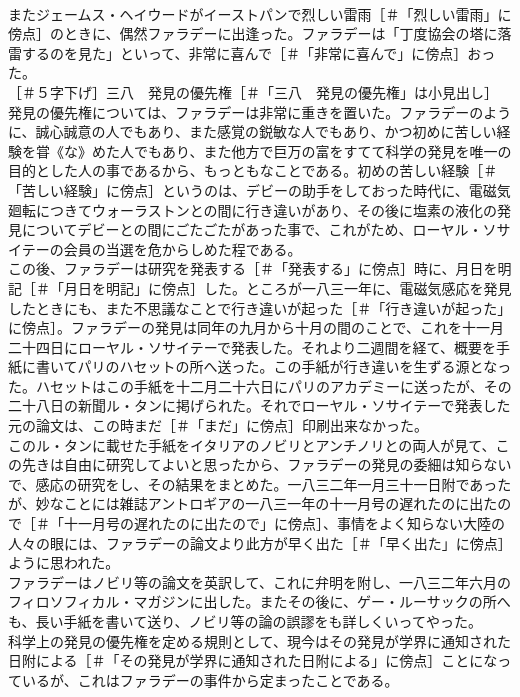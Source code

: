 \documentclass[8pt]{extreport}
\begin{document}
\begin{CJK}{UTF8}{min}
\\	またジェームス・ヘイウードがイーストパンで烈しい雷雨［＃「烈しい雷雨」に傍点］のときに、偶然ファラデーに出逢った。ファラデーは「丁度協会の塔に落雷するのを見た」といって、非常に喜んで［＃「非常に喜んで」に傍点］おった。
\\	［＃５字下げ］三八　発見の優先権［＃「三八　発見の優先権」は小見出し］
\\	発見の優先権については、ファラデーは非常に重きを置いた。ファラデーのように、誠心誠意の人でもあり、また感覚の鋭敏な人でもあり、かつ初めに苦しい経験を甞《な》めた人でもあり、また他方で巨万の富をすてて科学の発見を唯一の目的とした人の事であるから、もっともなことである。初めの苦しい経験［＃「苦しい経験」に傍点］というのは、デビーの助手をしておった時代に、電磁気廻転につきてウォーラストンとの間に行き違いがあり、その後に塩素の液化の発見についてデビーとの間にごたごたがあった事で、これがため、ローヤル・ソサイテーの会員の当選を危からしめた程である。
\\	この後、ファラデーは研究を発表する［＃「発表する」に傍点］時に、月日を明記［＃「月日を明記」に傍点］した。ところが一八三一年に、電磁気感応を発見したときにも、また不思議なことで行き違いが起った［＃「行き違いが起った」に傍点］。ファラデーの発見は同年の九月から十月の間のことで、これを十一月二十四日にローヤル・ソサイテーで発表した。それより二週間を経て、概要を手紙に書いてパリのハセットの所へ送った。この手紙が行き違いを生ずる源となった。ハセットはこの手紙を十二月二十六日にパリのアカデミーに送ったが、その二十八日の新聞ル・タンに掲げられた。それでローヤル・ソサイテーで発表した元の論文は、この時まだ［＃「まだ」に傍点］印刷出来なかった。
\\	このル・タンに載せた手紙をイタリアのノビリとアンチノリとの両人が見て、この先きは自由に研究してよいと思ったから、ファラデーの発見の委細は知らないで、感応の研究をし、その結果をまとめた。一八三二年一月三十一日附であったが、妙なことには雑誌アントロギアの一八三一年の十一月号の遅れたのに出たので［＃「十一月号の遅れたのに出たので」に傍点］、事情をよく知らない大陸の人々の眼には、ファラデーの論文より此方が早く出た［＃「早く出た」に傍点］ように思われた。
\\	ファラデーはノビリ等の論文を英訳して、これに弁明を附し、一八三二年六月のフィロソフィカル・マガジンに出した。またその後に、ゲー・ルーサックの所へも、長い手紙を書いて送り、ノビリ等の論の誤謬をも詳しくいってやった。
\\	科学上の発見の優先権を定める規則として、現今はその発見が学界に通知された日附による［＃「その発見が学界に通知された日附による」に傍点］ことになっているが、これはファラデーの事件から定まったことである。

\end{CJK}
\end{document}
